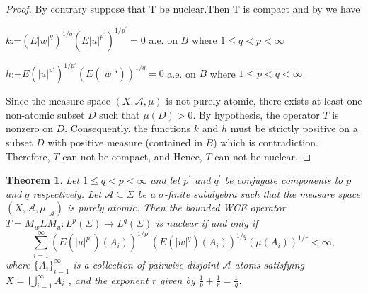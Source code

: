 \documentclass{amsart}
\newtheorem{thm}{Theorem}[section]
\theoremstyle{definition}\newtheorem{defn}[thm]{Definition}
\theoremstyle{remark}
\numberwithin{equation}{section}
\newcommand{\A}{\mathcal{A}}
\begin{document}
\begin{proof}
	By contrary suppose that T be nuclear.Then T is compact and by \cite{Estaremi2014} we have 
	\item $k$:=\((E|w|^{q})^{1 / q}(E|u|^{p^{\prime}})^{1 / p^{\prime}} = 0\) a.e. on \(B\) where \(1\leq q< p< \infty\)
	\item $h$:=\(E(|u|^{p'})^{1 / p'}(E(|w|^q))^{1 / q} = 0\) a.e. on \(B\) where \(1\leq p< q< \infty\)
	
	Since the measure space $(X, \A, \mu)$ is not purely atomic, there exists at least one non-atomic subset $D$ such that $\mu(D) > 0 $. By hypothesis, the operator $T$ is nonzero on $D$. Consequently, the functions $k$ and $h$  must be strictly positive on a subset $D$ with positive measure (contained in $B$) which is contradiction. Therefore, $T$ can not be compact, and Hence, $T$ can not be nuclear.
\end{proof}
\begin{thm}\label{thm2.7}
	Let $1 \leq q<p < \infty$ and let \(p^{\prime}\) and \(q^{\prime}\) be conjugate components to \(p\) and \(q\) respectively. Let $\A \subseteq \Sigma$ be a $\sigma$-finite subalgebra such that the measure space $(X, \A, \mu|_{\A})$ is purely atomic. Then the bounded WCE operator $T = M_w E M_u : L^p(\Sigma) \to L^q(\Sigma)$ is nuclear if and only if
	\[
	\sum_{i=1}^{\infty} (E(|u|^{p'})(A_i))^{1/{p'}} (E(|w|^q)(A_i))^{1/q} (\mu(A_i))^{1/r} < \infty,
	\]
	where $\{A_i\}_{i=1}^{\infty}$ is a collection of pairwise disjoint $\A$-atoms satisfying $X = \bigcup_{i=1}^{\infty} A_i$ , and the exponent $r$ given by $\frac{1}{p} + \frac{1}{r} = \frac{1}{q}$.
\end{thm}
\end{document}
